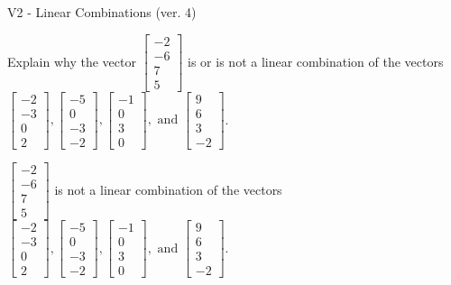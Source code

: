 \begin{exercise}
  \begin{exerciseTitle}V2 - Linear Combinations (ver. 4)\end{exerciseTitle}
  \begin{exerciseStatement}
    Explain why the vector \(\left[\begin{array}{c}
-2 \\
-6 \\
7 \\
5
\end{array}\right]\)  is or is not a linear 
	combination of the vectors \(\left[\begin{array}{c}
-2 \\
-3 \\
0 \\
2
\end{array}\right] , \left[\begin{array}{c}
-5 \\
0 \\
-3 \\
-2
\end{array}\right] , \left[\begin{array}{c}
-1 \\
0 \\
3 \\
0
\end{array}\right] , \text{ and } \left[\begin{array}{c}
9 \\
6 \\
3 \\
-2
\end{array}\right]\).
	


  \end{exerciseStatement}
  \begin{exerciseAnswer}
   \(\left[\begin{array}{c}
-2 \\
-6 \\
7 \\
5
\end{array}\right]\) 
  	 is not  
	a linear combination of the vectors \(\left[\begin{array}{c}
-2 \\
-3 \\
0 \\
2
\end{array}\right] , \left[\begin{array}{c}
-5 \\
0 \\
-3 \\
-2
\end{array}\right] , \left[\begin{array}{c}
-1 \\
0 \\
3 \\
0
\end{array}\right] , \text{ and } \left[\begin{array}{c}
9 \\
6 \\
3 \\
-2
\end{array}\right]\).


\end{exerciseAnswer}
\end{exercise}
